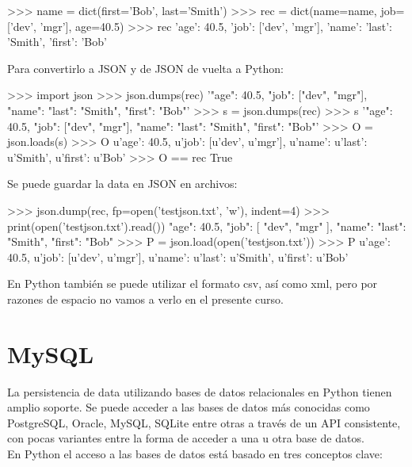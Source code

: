 \begin{pyglist} [language=python]
>>> name = dict(first='Bob', last='Smith')
>>> rec = dict(name=name, job=['dev', 'mgr'], age=40.5)
>>> rec
{'age': 40.5, 'job': ['dev', 'mgr'], 'name': {'last': 'Smith', 'first': 'Bob'}}
\end{pyglist}

Para convertirlo a JSON y de JSON de vuelta a Python:\\

\begin{pyglist} [language=python]
>>> import json
>>> json.dumps(rec)
'{"age": 40.5, "job": ["dev", "mgr"], "name": {"last": "Smith", "first": "Bob"}}'
>>> s = json.dumps(rec)
>>> s
'{"age": 40.5, "job": ["dev", "mgr"], "name": {"last": "Smith", "first": "Bob"}}'
>>> O = json.loads(s)
>>> O
{u'age': 40.5, u'job': [u'dev', u'mgr'], 
u'name': {u'last': u'Smith', u'first': u'Bob'}}
>>> O == rec
True
\end{pyglist}

Se puede guardar la data en JSON en archivos:\\

\begin{pyglist} [language=python]
>>> json.dump(rec, fp=open('testjson.txt', 'w'), indent=4)
>>> print(open('testjson.txt').read())
{
    "age": 40.5, 
    "job": [
        "dev", 
        "mgr"
    ], 
    "name": {
        "last": "Smith", 
        "first": "Bob"
    }
}
>>> P = json.load(open('testjson.txt'))
>>> P
{u'age': 40.5, u'job': [u'dev', u'mgr'], 
u'name': {u'last': u'Smith', u'first': u'Bob'}}
\end{pyglist}

En Python también se puede utilizar el formato csv, así como xml, pero por razones de espacio no vamos a verlo en el presente curso.

\section{MySQL}

La persistencia de data utilizando bases de datos relacionales en Python tienen amplio soporte. Se puede acceder a las bases de datos más conocidas como PostgreSQL, Oracle, MySQL, SQLite entre otras a través de un API consistente, con pocas variantes entre la forma de acceder a una u otra base de datos.\\

En Python el acceso a las bases de datos está basado en tres conceptos clave:\\

